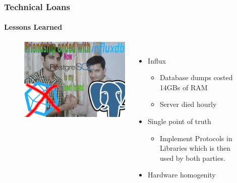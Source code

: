 \begin{frame}
  \frametitle{Technical Loans}
  \framesubtitle{Lessons Learned}

\begin{figure}
\begin{columns}
\begin{center}
\includegraphics[height=0.65\textheight]{figs/meme_postgres_influx.png}
\end{center}
\raggedright
\vspace{0.5cm}

\begin{itemize}
  \item Influx
        \begin{itemize}
          \item Database dumps costed 14GBs of RAM
          \item Server died hourly
        \end{itemize}
    \item Single point of truth
    \begin{itemize}
        \item Implement Protocols in Libraries which is then used by both parties.
    \end{itemize}
    \item Hardware homogenity
\end{itemize}
\end{columns}
\end{figure}

\end{frame}

